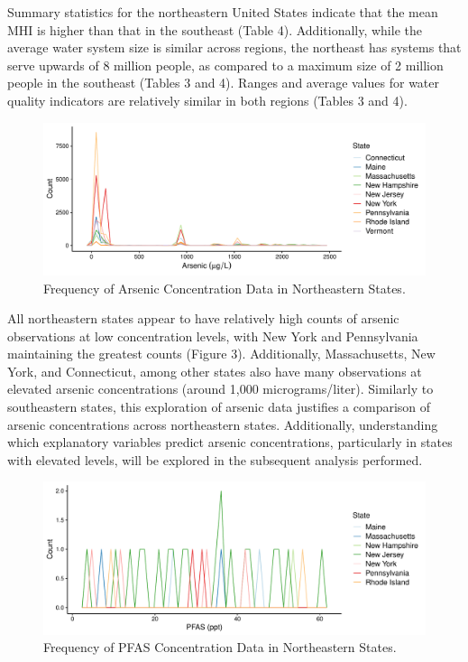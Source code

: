 \documentclass[12pt,]{article}
\begin{document}
Summary statistics for the northeastern United States indicate that the
mean MHI is higher than that in the southeast (Table 4). Additionally,
while the average water system size is similar across regions, the
northeast has systems that serve upwards of 8 million people, as
compared to a maximum size of 2 million people in the southeast (Tables
3 and 4). Ranges and average values for water quality indicators are
relatively similar in both regions (Tables 3 and 4).

\begin{figure}
\centering
\includegraphics{Project_Template_files/figure-latex/figs3-1.pdf}
\caption{Frequency of Arsenic Concentration Data in Northeastern
States.}
\end{figure}

All northeastern states appear to have relatively high counts of arsenic
observations at low concentration levels, with New York and Pennsylvania
maintaining the greatest counts (Figure 3). Additionally, Massachusetts,
New York, and Connecticut, among other states also have many
observations at elevated arsenic concentrations (around 1,000
micrograms/liter). Similarly to southeastern states, this exploration of
arsenic data justifies a comparison of arsenic concentrations across
northeastern states. Additionally, understanding which explanatory
variables predict arsenic concentrations, particularly in states with
elevated levels, will be explored in the subsequent analysis performed.

\begin{figure}
\centering
\includegraphics{Project_Template_files/figure-latex/figs4-1.pdf}
\caption{Frequency of PFAS Concentration Data in Northeastern States.}
\end{figure}
\end{document}
